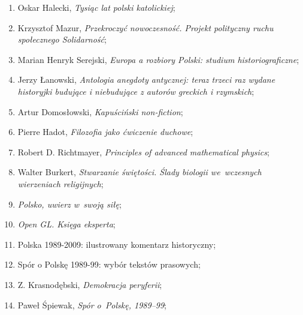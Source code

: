 \documentclass[a4paper,11pt]{article}
\begin{document}
\begin{enumerate}
\item Oskar Halecki, \textit{Tysiąc lat polski katolickiej};



\item Krzysztof Mazur, \textit{Przekroczyć nowoczesność. Projekt
    polityczny ruchu społecznego Solidarność};



\item Marian Henryk Serejski, \textit{Europa a rozbiory Polski: studium
    historiograficzne};



\item Jerzy Łanowski, \textit{Antologia anegdoty antycznej: teraz trzeci
    raz wydane historyjki budujące i niebudujące z autorów greckich i
    rzymskich};



\item Artur Domosłowski, \textit{Kapuściński non-fiction};



\item Pierre Hadot, \textit{Filozofia jako ćwiczenie duchowe};



\item Robert D. Richtmayer, \textit{Principles of advanced mathematical
    physics};



\item Walter Burkert, \textit{Stwarzanie świętości. Ślady biologii
    we~wczesnych wierzeniach religijnych};



\item \textit{Polsko, uwierz w~swoją siłę};



\item \textit{Open GL. Księga eksperta};



\item Polska 1989-2009: ilustrowany komentarz historyczny;



\item Spór o Polskę 1989-99: wybór tekstów prasowych;



\item Z. Krasnodębski, \textit{Demokracja peryferii};



\item Paweł Śpiewak, \textit{Spór o~Polskę, 1989--99};




\end{enumerate}
\end{document}
